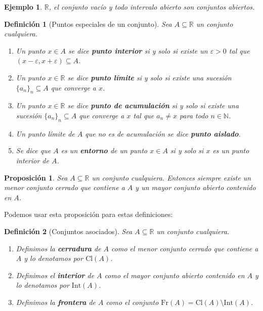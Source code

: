 \documentclass{article}
\newtheorem{prop}{Proposición}
\newtheorem{define}{Definición}
\newtheorem{ejem}{Ejemplo}
\newcommand{\reales}{\mathbb{R}}
\newcommand{\naturales}{\mathbb{N}}
\newcommand{\sucesion}[1]{\{ #1 _n \}_n}
\newcommand{\cerradura}[1]{\text{Cl}(#1)}
\newcommand{\interior}[1]{\text{Int}(#1)}
\newcommand{\frontera}[1]{\text{Fr}(#1)}
\begin{document}
\begin{ejem}
	$\reales$, el conjunto vacío y todo intervalo abierto son conjuntos abiertos.
\end{ejem}

\begin{define}[Puntos especiales de un conjunto]
	Sea $A \subseteq \reales$ un conjunto cualquiera.
	\begin{enumerate}
		\item
		Un punto $x \in A$ se dice \textbf{punto interior} si y solo si existe un $\varepsilon > 0$ tal que $(x - \varepsilon, x + \varepsilon) \subseteq A$.
		\item
		Un punto $x \in \reales$ se dice \textbf{punto límite} si y solo si existe una sucesión $\sucesion{a} \subseteq A$ que converge a $x$.
		\item
		Un punto $x \in \reales $ se dice \textbf{punto de acumulación} si y solo si existe una sucesión $\sucesion{a} \subseteq A$ que converge a $x$ tal que $a_n \neq x$ para todo $n \in \naturales$.
		\item
		Un punto límite de $A$ que no es de acumulación se dice \textbf{punto aislado}.
		\item
		Se dice que $A$ es un \textbf{entorno} de un punto $x \in A$ si y solo si $x$ es un punto interior de $A$.
	\end{enumerate}
\end{define}

\begin{prop}
	Sea $A \subseteq \reales$ un conjunto cualquiera. Entonces siempre existe un menor conjunto cerrado que contiene a $A$ y un mayor conjunto abierto contenido en $A$.
\end{prop}

Podemos usar esta proposición para estas definiciones:

\begin{define}[Conjuntos asociados]
	Sea $A \subseteq \reales$ un conjunto cualquiera.
	\begin{enumerate}
		\item
		Definimos la \textbf{cerradura} de $A$ como el menor conjunto cerrado que contiene a $A$ y lo denotamos por $\cerradura{A}$.
		\item
		Definimos el \textbf{interior} de $A$ como el mayor conjunto abierto contenido en $A$ y lo denotamos por $\interior{A}$.
		\item
		Definimos la \textbf{frontera} de $A$ como el conjunto $\frontera{A} = \cerradura{A} \setminus \interior{A}$.
	\end{enumerate}
\end{define}
\end{document}
